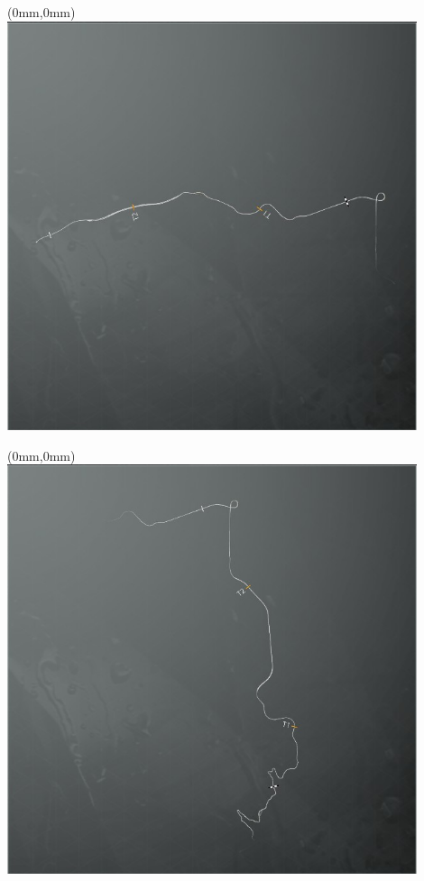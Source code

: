 \null\newpage
\begin{textblock*}{30mm}(0mm,0mm)%
\includegraphics[width=120mm]{TR/2015-05-20_00016.png}
\end{textblock*}
\null\newpage
\begin{textblock*}{30mm}(0mm,0mm)%
\includegraphics[width=120mm]{TR/2015-05-20_00015.png}
\end{textblock*}
